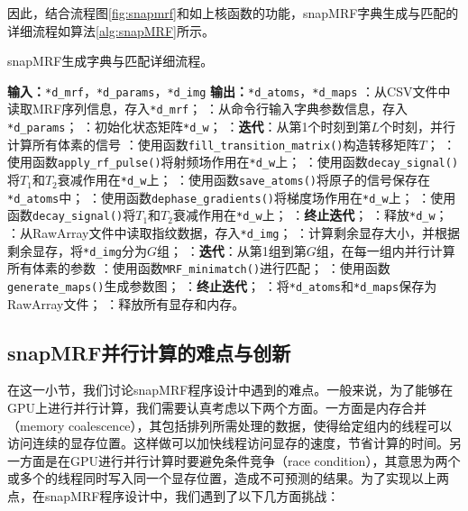 因此，结合流程图\ref{fig:snapmrf}和如上核函数的功能，snapMRF字典生成与匹配的详细流程如算法\ref{alg:snapMRF}所示。
\begin{algorithm}
	\caption{snapMRF生成字典与匹配详细流程。}
	\label{alg:snapMRF}
	\begin{algorithmic}
		\INDSTATE[-1.25] \textbf{输入：}\texttt{*d\_mrf}，\texttt{*d\_params}，\texttt{*d\_img}
		\INDSTATE[-1.25] \textbf{输出：}\texttt{*d\_atoms}，\texttt{*d\_maps}
		：从CSV文件中读取MRF序列信息，存入\texttt{*d\_mrf}；
		：从命令行输入字典参数信息，存入\texttt{*d\_params}；
		：初始化状态矩阵\texttt{*d\_w}；
		：\textbf{迭代}：从第1个时刻到第$L$个时刻，并行计算所有体素的信号
		：\qquad 使用函数\texttt{fill\_transition\_matrix()}构造转移矩阵$T$；
		：\qquad 使用函数\texttt{apply\_rf\_pulse()}将射频场作用在\texttt{*d\_w}上；
		：\qquad 使用函数\texttt{decay\_signal()}将$T_1$和$T_2$衰减作用在\texttt{*d\_w}上；
		：\qquad 使用函数\texttt{save\_atoms()}将原子的信号保存在\texttt{*d\_atoms}中；
		：\qquad 使用函数\texttt{dephase\_gradients()}将梯度场作用在\texttt{*d\_w}上；
		：\qquad 使用函数\texttt{decay\_signal()}将$T_1$和$T_2$衰减作用在\texttt{*d\_w}上；
		：\textbf{终止迭代}；
		：释放\texttt{*d\_w}；
		：从RawArray文件中读取指纹数据，存入\texttt{*d\_img}；
		：计算剩余显存大小，并根据剩余显存，将\texttt{*d\_img}分为$G$组；
		：\textbf{迭代}：从第1组到第$G$组，在每一组内并行计算所有体素的参数
		：\qquad 使用函数\texttt{MRF\_minimatch()}进行匹配；
		：\qquad 使用函数\texttt{generate\_maps()}生成参数图；
		：\textbf{终止迭代}；
		：将\texttt{*d\_atoms}和\texttt{*d\_maps}保存为RawArray文件；
		：释放所有显存和内存。
	\end{algorithmic}
\end{algorithm}

\subsection{snapMRF并行计算的难点与创新}
在这一小节，我们讨论snapMRF程序设计中遇到的难点。一般来说，为了能够在GPU上进行并行计算，我们需要认真考虑以下两个方面。一方面是内存合并（memory coalescence），其包括排列所需处理的数据，使得给定组内的线程可以访问连续的显存位置。这样做可以加快线程访问显存的速度，节省计算的时间。另一方面是在GPU进行并行计算时要避免条件竞争（race condition），其意思为两个或多个的线程同时写入同一个显存位置，造成不可预测的结果。为了实现以上两点，在snapMRF程序设计中，我们遇到了以下几方面挑战：

